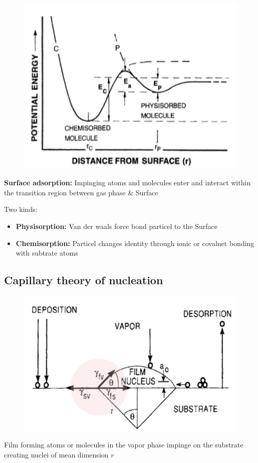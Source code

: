 \begin{figure}[h]
    \centering
    \includegraphics[width=0.7\columnwidth]{images/surfacedistance.png}
    \label{fig:surfdist}
\end{figure}
\textbf{Surface adsorption: }Impinging atoms and molecules enter and interact within the transition region between gas phase \& Surface

Two kinds:
\begin{itemize}
    \item \textbf{Physisorption:} Van der waals force bond particel to the Surface
    \item \textbf{Chemisorption:} Particel changes identity through ionic or covalnet bonding with subtrate atoms
\end{itemize}

\subsection{Capillary theory of nucleation}
\begin{figure}[h]
    \centering
    \includegraphics[width=0.7\columnwidth]{images/nucleation.png}
    \label{fig:nucleation}
\end{figure}
Film forming atoms or molecules in the vapor phase impinge on the substrate creating nuclei of mean dimension \(r\)

